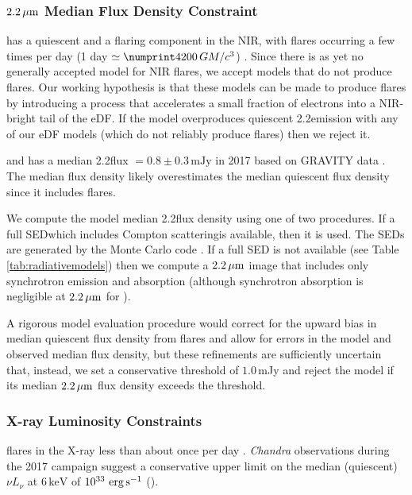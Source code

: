 \subsubsection{\texorpdfstring{$2.2\,\mu\mathrm{m}$}{2um} Median Flux Density Constraint}\label{subsec:nir}

\sgra has a quiescent and a flaring component in the NIR, with flares occurring a few times per day
(1 day $\simeq \no{4200}\,\tg$) \citep{2018ApJ...863...15W}.
Since there is as yet no generally accepted model for NIR flares, we accept models that do not produce flares.
Our working hypothesis is that these models can be made to produce flares by introducing a process that accelerates a small fraction of electrons into a  NIR-bright tail of the eDF.
If the model overproduces quiescent 2.2\um emission with any of our eDF models (which do not reliably produce flares) then we reject it.

\sgra and has a median 2.2\um flux $= 0.8 \pm 0.3\,\mathrm{mJy}$ in 2017 based on GRAVITY data \citep[][see Table 1]{2020A&A...638A...2G}.
The median flux density likely overestimates the median quiescent flux density since it includes flares.

We compute the model median 2.2\um flux density using one of two procedures.
If a full SED\textemdash which includes Compton scattering\textemdash is available, then it is used.
The SEDs are generated by the \grmonty Monte Carlo code \citep{2009ApJS..184..387D, Wong_2022}.
If a full SED is not available (see Table \ref{tab:radiativemodels}) then we compute a $2.2\,\mu\mathrm{m}$ image that includes only synchrotron emission and absorption (although synchrotron absorption is negligible at $2.2\,\mu\mathrm{m}$ for \sgra).

A rigorous model evaluation procedure would correct for the upward bias in median quiescent flux density from flares and allow for errors in the model and observed median flux density, but these refinements are sufficiently uncertain that, instead, we set a conservative threshold of $1.0$\,mJy and reject the model if its
median $2.2\,\mu\mathrm{m}$ flux density exceeds the threshold.

\subsubsection{X-ray Luminosity Constraints}

\sgra flares in the X-ray less than about once per day \citep[see][and references therein]{2018MNRAS.473..306Y}.
\emph{Chandra} observations during the 2017 campaign suggest a conservative upper limit on the median (quiescent) $\nu L_\nu$ at $6\,\mathrm{keV}$ of $10^{33}\,\,\mathrm{erg}\,\mathrm{s}^{-1}$ ().

